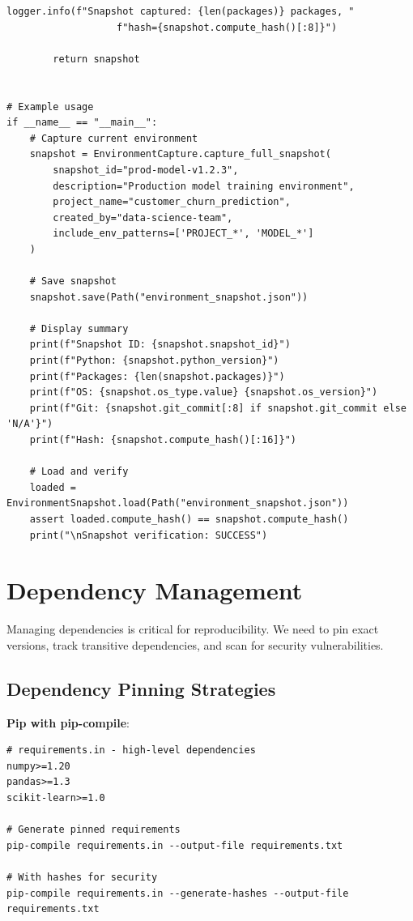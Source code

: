 \begin{lstlisting}[style=python, caption={Complete environment snapshot system}]
        logger.info(f"Snapshot captured: {len(packages)} packages, "
                   f"hash={snapshot.compute_hash()[:8]}")

        return snapshot


# Example usage
if __name__ == "__main__":
    # Capture current environment
    snapshot = EnvironmentCapture.capture_full_snapshot(
        snapshot_id="prod-model-v1.2.3",
        description="Production model training environment",
        project_name="customer_churn_prediction",
        created_by="data-science-team",
        include_env_patterns=['PROJECT_*', 'MODEL_*']
    )

    # Save snapshot
    snapshot.save(Path("environment_snapshot.json"))

    # Display summary
    print(f"Snapshot ID: {snapshot.snapshot_id}")
    print(f"Python: {snapshot.python_version}")
    print(f"Packages: {len(snapshot.packages)}")
    print(f"OS: {snapshot.os_type.value} {snapshot.os_version}")
    print(f"Git: {snapshot.git_commit[:8] if snapshot.git_commit else 'N/A'}")
    print(f"Hash: {snapshot.compute_hash()[:16]}")

    # Load and verify
    loaded = EnvironmentSnapshot.load(Path("environment_snapshot.json"))
    assert loaded.compute_hash() == snapshot.compute_hash()
    print("\nSnapshot verification: SUCCESS")
\end{lstlisting}

\section{Dependency Management}

Managing dependencies is critical for reproducibility. We need to pin exact versions, track transitive dependencies, and scan for security vulnerabilities.

\subsection{Dependency Pinning Strategies}

\textbf{Pip with pip-compile}:

\begin{lstlisting}[style=shell, caption={Using pip-tools for dependency pinning}]
# requirements.in - high-level dependencies
numpy>=1.20
pandas>=1.3
scikit-learn>=1.0

# Generate pinned requirements
pip-compile requirements.in --output-file requirements.txt

# With hashes for security
pip-compile requirements.in --generate-hashes --output-file requirements.txt
\end{lstlisting}

